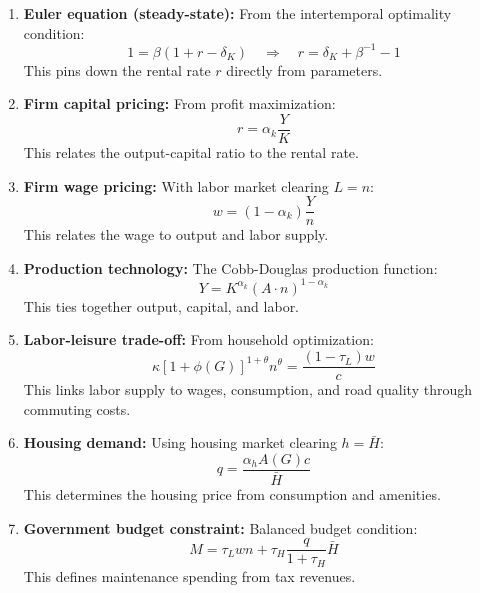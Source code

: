 \begin{enumerate}
    \item \textbf{Euler equation (steady-state):} From the intertemporal optimality condition:
    \begin{equation}
    1 = \beta(1 + r - \delta_K) \quad \Rightarrow \quad r = \delta_K + \beta^{-1} - 1
    \end{equation}
    This pins down the rental rate $r$ directly from parameters.

    \item \textbf{Firm capital pricing:} From profit maximization:
    \begin{equation}
    r = \alpha_k \frac{Y}{K}
    \end{equation}
    This relates the output-capital ratio to the rental rate.

    \item \textbf{Firm wage pricing:} With labor market clearing $L = n$:
    \begin{equation}
    w = (1-\alpha_k) \frac{Y}{n}
    \end{equation}
    This relates the wage to output and labor supply.

    \item \textbf{Production technology:} The Cobb-Douglas production function:
    \begin{equation}
    Y = K^{\alpha_k}(A \cdot n)^{1-\alpha_k}
    \end{equation}
    This ties together output, capital, and labor.

    \item \textbf{Labor-leisure trade-off:} From household optimization:
    \begin{equation}
    \kappa [1+\phi(G)]^{1+\theta} n^\theta = \frac{(1-\tau_L)w}{c}
    \end{equation}
    This links labor supply to wages, consumption, and road quality through commuting costs.

    \item \textbf{Housing demand:} Using housing market clearing $h = \bar{H}$:
    \begin{equation}
    q = \frac{\alpha_h A(G) c}{\bar{H}}
    \end{equation}
    This determines the housing price from consumption and amenities.

    \item \textbf{Government budget constraint:} Balanced budget condition:
    \begin{equation}
    M = \tau_L w n + \tau_H \frac{q}{1+\tau_H} \bar{H}
    \end{equation}
    This defines maintenance spending from tax revenues.


\end{enumerate}
